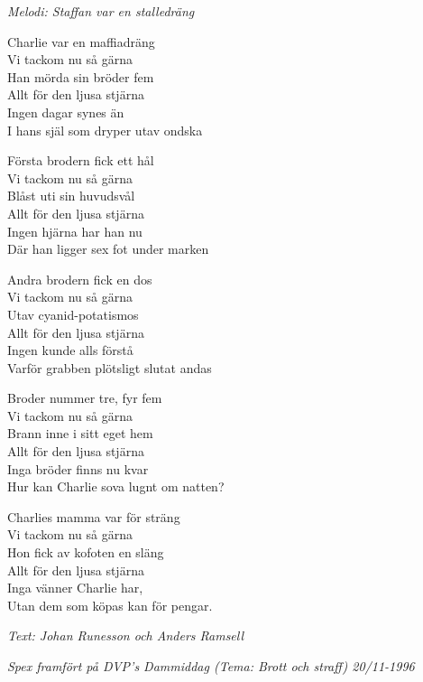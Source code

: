 {\footnotesize\textit{Melodi: Staffan var en stalledräng}}\par
\vspace{10pt}
Charlie var en maffiadräng\\
Vi tackom nu så gärna\\
Han mörda sin bröder fem\\
Allt för den ljusa stjärna\\
Ingen dagar synes än\\
I hans själ som dryper utav ondska\par
\vspace{10pt}
Första brodern fick ett hål\\
Vi tackom nu så gärna\\
Blåst uti sin huvudsvål\\
Allt för den ljusa stjärna\\
Ingen hjärna har han nu\\
Där han ligger sex fot under marken\par
\vspace{10pt}
Andra brodern fick en dos\\
Vi tackom nu så gärna\\
Utav cyanid-potatismos\\
Allt för den ljusa stjärna\\
Ingen kunde alls förstå\\
Varför grabben plötsligt slutat andas\par
\vspace{10pt}
Broder nummer tre, fyr fem\\
Vi tackom nu så gärna\\
Brann inne i sitt eget hem\\
Allt för den ljusa stjärna\\
Inga bröder finns nu kvar\\
Hur kan Charlie sova lugnt om natten?\par
\vspace{10pt}
Charlies mamma var för sträng\\
Vi tackom nu så gärna\\
Hon fick av kofoten en släng\\
Allt för den ljusa stjärna\\
Inga vänner Charlie har,\\
Utan dem som köpas kan för pengar.\par
\vspace{10pt}
{\footnotesize\textit{Text: Johan Runesson och Anders Ramsell}}\par
\vspace{10pt}
{\footnotesize\textit{Spex framfört på DVP's Dammiddag (Tema: Brott och straff) 20/11-1996}}
